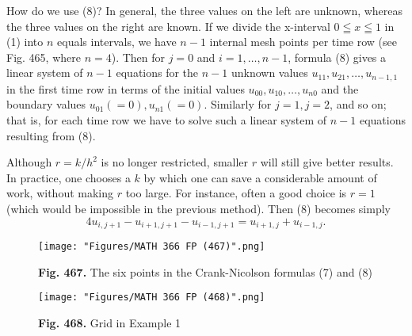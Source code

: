 How do we use (8)? In general, the three values on the left are unknown, whereas the three values on the right are known. If we divide the x-interval $0\leqq x \leqq 1$ in (1) into $n$ equals intervals, we have $n-1$ internal mesh points per time row (see Fig. 465, where $n=4$). Then for $j=0$ and $i=1,\dots,n-1$, formula (8) gives a linear system of $n-1$ equations for the $n-1$ unknown values $u_{11},u_{21},\dots,u_{n-1,1}$ in the first time row in terms of the initial values $u_{00},u_{10},\dots,u_{n0}$ and the boundary values $u_{01}(=0),u_{n1}(=0)$. Similarly for $j=1,j=2$, and so on; that is, for each time row we have to solve such a linear system of $n-1$ equations resulting from (8).

Although $r=k/h^2$ is no longer restricted, smaller $r$ will still give better results. In practice, one chooses a $k$ by which one can save a considerable amount of work, without making $r$ too large. For instance, often a good choice is $r=1$ (which would be impossible in the previous method). Then (8) becomes simply
\begin{equation}\tag{21.9}
4u_{i,j+1}-u_{i+1,j+1}-u_{i-1,j+1}=u_{i+1,j}+u_{i-1,j}.
\end{equation}
\begin{figure}[htbp]
\begin{center}
\texttt{[image: "Figures/MATH 366 FP (467)".png]}
\caption*{\small{\textbf{\color{blue} Fig. 467.}} The six points in the Crank-Nicolson formulas (7) and (8)}
\end{center}
\end{figure}
\begin{figure}[htbp]
\begin{center}
\texttt{[image: "Figures/MATH 366 FP (468)".png]}
\caption*{\small{\textbf{\color{blue} Fig. 468.}} Grid in Example 1}
\end{center}
\end{figure}
\newline
